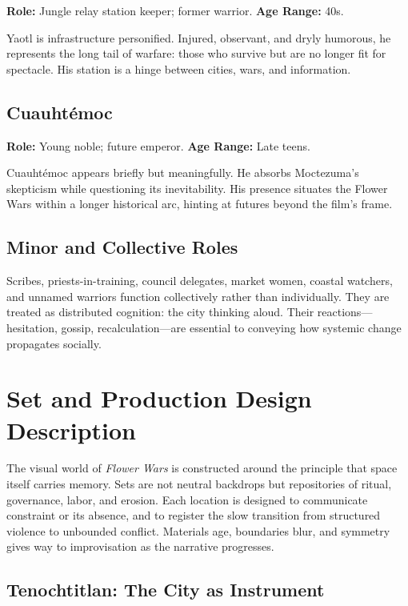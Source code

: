 \documentclass[12pt]{article}
\begin{document}
\textbf{Role:} Jungle relay station keeper; former warrior.  
\textbf{Age Range:} 40s.

Yaotl is infrastructure personified. Injured, observant, and dryly humorous, he represents the long tail of warfare: those who survive but are no longer fit for spectacle. His station is a hinge between cities, wars, and information.

\subsection*{Cuauhtémoc}

\textbf{Role:} Young noble; future emperor.  
\textbf{Age Range:} Late teens.

Cuauhtémoc appears briefly but meaningfully. He absorbs Moctezuma's skepticism while questioning its inevitability. His presence situates the Flower Wars within a longer historical arc, hinting at futures beyond the film's frame.

\subsection*{Minor and Collective Roles}

Scribes, priests-in-training, council delegates, market women, coastal watchers, and unnamed warriors function collectively rather than individually. They are treated as distributed cognition: the city thinking aloud. Their reactions—hesitation, gossip, recalculation—are essential to conveying how systemic change propagates socially.

\section*{Set and Production Design Description}

The visual world of \textit{Flower Wars} is constructed around the principle that space itself carries memory. Sets are not neutral backdrops but repositories of ritual, governance, labor, and erosion. Each location is designed to communicate constraint or its absence, and to register the slow transition from structured violence to unbounded conflict. Materials age, boundaries blur, and symmetry gives way to improvisation as the narrative progresses.

\subsection*{Tenochtitlan: The City as Instrument}
\end{document}
